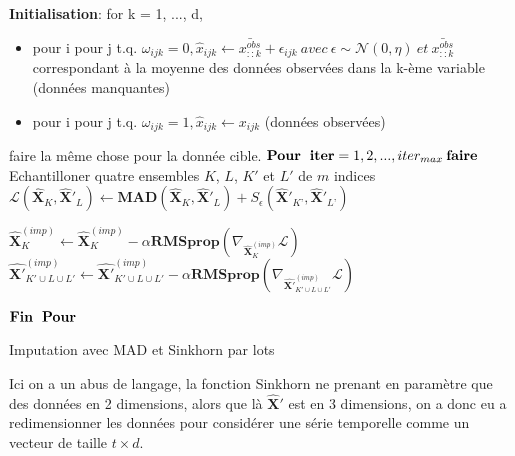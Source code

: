 \documentclass[acmsmall, natbib=false, nonacm]{acmart}
\begin{document}
\begin{algorithm}[H]
    \tabto{0.2cm}\textbf{Initialisation}: for k = 1, ..., d,
    \begin{itemize}
        \item pour i pour j t.q. $\omega_{ijk} = 0, \hat{x}_{ijk} \leftarrow \bar{x_{::k}^{\textit{obs}}} + \epsilon_{ijk}\: avec\: \epsilon \sim \mathcal{N}(0,\eta)\: et\: \bar{x_{::k}^{\textit{obs}}}$ correspondant à la moyenne des données observées dans la k-ème variable (données manquantes)
        \item pour i pour j t.q. $\omega_{ijk} = 1, \hat{x}_{ijk} \leftarrow x_{ijk}$ (données observées)
    \end{itemize}
    \tabto{0.2cm} faire la même chose pour la donnée cible. 
    \tabto{0.2cm}$\textbf{Pour\: iter} = 1,2, ..., iter_{max}\: \textbf{faire}$
    \tabto{1cm}Echantilloner quatre ensembles $\textit{K}$, $\textit{L}$, $\textit{K}'$ et $\textit{L}'$ de $\textit{m}$ indices 
    \tabto{1cm}$\mathcal{L}(\hat{\textbf{X}}_{\textit{K}},\hat{\textbf{X}}'_{\textit{L}}) \leftarrow \textbf{MAD}(\hat{\textbf{X}}_{\textit{K}},\hat{\textbf{X}}'_{\textit{L}}) + S_{\epsilon}(\hat{\textbf{X}}'_{\textit{K'}},\hat{\textbf{X}}'_{\textit{L'}})$
    
    \tabto{1cm}$\hat{\textbf{X}}_{\textit{K}}^{(\textit{imp})} \leftarrow \hat{\textbf{X}}_{\textit{K}}^{(\textit{imp})} - \alpha \textbf{RMSprop}(\nabla_{\hat{\textbf{X}}_{\textit{K}}^{(\textit{imp})}} \mathcal{L})$
    \tabto{1cm}$\hat{\textbf{X}'}_{\textit{K}' \cup \textit{L} \cup \textit{L}'}^{(\textit{imp})} \leftarrow \hat{\textbf{X}'}_{\textit{K}' \cup \textit{L} \cup \textit{L}'}^{(\textit{imp})} - \alpha \textbf{RMSprop}(\nabla_{\hat{\textbf{X}'}_{\textit{K}' \cup \textit{L} \cup \textit{L}'}^{(\textit{imp})}} \mathcal{L})$
    
    \tabto{0.2cm}$\textbf{Fin\: Pour}$
    
    
    
    \caption{{Imputation avec MAD et Sinkhorn par lots} \label{Algorithm3}}
    
\end{algorithm}

Ici on a un abus de langage, la fonction Sinkhorn ne prenant en paramètre que des données en 2 dimensions,
alors que là $\hat{\mathbf{X}}'$ est en 3 dimensions, on a donc eu a redimensionner les données pour considérer une série temporelle comme un vecteur de taille $t\times d$.
\end{document}
